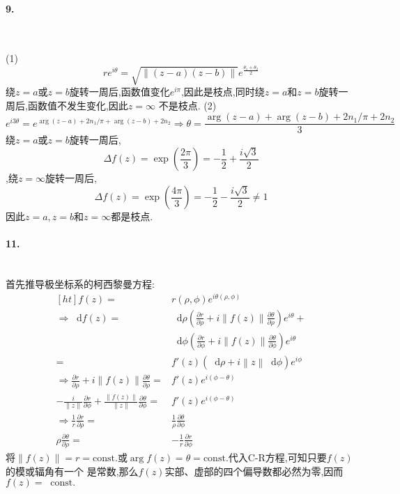 \documentclass[UTF8]{ctexart}
\newcommand{\dif}{\mathop{}\!\mathrm{d}}
\newcommand{\const}{\mathop{}\!\mathrm{const.}}
\begin{document}
\paragraph{9.}~{}

(1) \\
\begin{equation}
  re^{i\theta}=\sqrt{\left\| (z-a)(z-b) \right\|}e^{\frac{\theta_{1}+\theta_{2}}{2}}
\end{equation}
绕$z=a$或$z=b$旋转一周后,函数值变化$e^{i\pi}$,因此是枝点,同时绕$z=a$和$z=b$旋转一周后,函数值不发生变化,因此$z=\infty$
不是枝点.
(2)
\begin{equation}
  e^{i 3\theta}=e^{\arg(z-a)+2n_{1}/\pi+\arg(z-b)+2n_{2}}\Rightarrow\theta=\frac{\arg(z-a)+\arg(z-b)+2n_{1}/\pi+2n_{2}}{3}
\end{equation}
绕$z=a$或$z=b$旋转一周后,
\begin{equation}
  \Delta f(z)=\exp(\frac{2\pi}{3})=-\frac{1}{2}+\frac{i \sqrt{3}}{2}
\end{equation}
,绕$z=\infty$旋转一周后,
\begin{equation}
  \Delta f(z)=\exp(\frac{4\pi}{3})=-\frac{1}{2}-\frac{i \sqrt{3}}{2}\not=1
\end{equation}
因此$z=a,z=b$和$z=\infty$都是枝点.

\paragraph{11.}~{} \\
首先推导极坐标系的柯西黎曼方程:
\begin{equation}
  \begin{aligned}
    [ht]
    f(z)=&r(\rho,\phi)e^{i\theta\left(\rho,\phi\right)} \\
  \Rightarrow \dif f(z)=&\dif\rho(\frac{\partial r}{\partial \rho}+i\left\|f(z) \right\| \frac{\partial \theta}{\partial \rho})e^{i\theta}+ \\
  &\dif\phi(\frac{\partial r}{\partial \phi}+i\left\|f(z) \right\| \frac{\partial \theta}{\partial \phi})e^{i\theta} \\
  =&f'(z)(\dif\rho+i \left\|z \right\| \dif\phi)e^{i\phi} \\
  \Rightarrow \frac{\partial r}{\partial \rho}+i\left\|f(z) \right\| \frac{\partial \theta}{\partial \rho}=&f'(z)e^{i\left(\phi-\theta\right)} \\
  -\frac{i}{\left\|z \right\| }\frac{\partial r}{\partial \phi}+\frac{\left\|f(z) \right\|}{\left\|z \right\| } \frac{\partial \theta}{\partial \phi}=&f'(z)e^{i\left(\phi-\theta\right)} \\
\Rightarrow \frac{1}{r}\frac{\partial r}{\partial \rho}=&\frac{1}{\rho}\frac{\partial \theta}{\partial \phi} \\
\rho\frac{\partial \theta}{\partial \rho}=&-\frac{1}{r}\frac{\partial r}{\partial \phi}
  \end{aligned}
\end{equation}
将$\left\| f(z) \right\|=r=\mathrm{const.}$或$\arg f(z)=\theta =\mathrm{const.}$代入C-R方程,可知只要$f(z)$的模或辐角有一个
是常数,那么$f(z)$实部、虚部的四个偏导数都必然为零,因而$f(z)=\mathrm{\const}$
\end{document}
